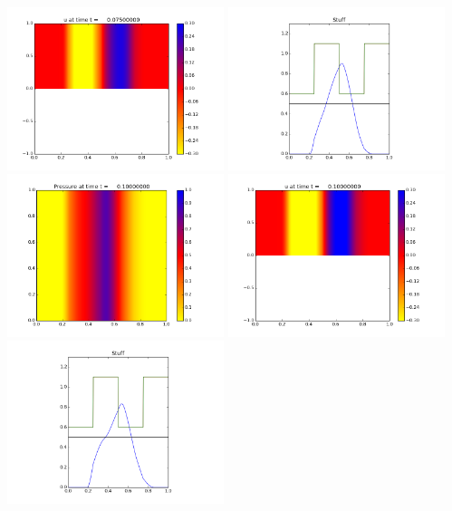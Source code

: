\documentclass[11pt]{article}
\begin{document}
\includegraphics[width=0.475\textwidth]{frame0003fig1.png}
\vskip 10pt 
\includegraphics[width=0.475\textwidth]{frame0003fig3.png}
\vskip 10pt 
\includegraphics[width=0.475\textwidth]{frame0004fig0.png}
\includegraphics[width=0.475\textwidth]{frame0004fig1.png}
\vskip 10pt 
\includegraphics[width=0.475\textwidth]{frame0004fig3.png}
\end{document}
